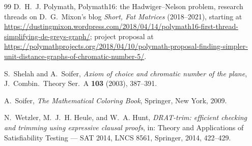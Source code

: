 \documentclass[11pt]{article}
\theoremstyle{definition}
\theoremstyle{remark}
\begin{document}
\begin{thebibliography}{99}
D.~H.~J. Polymath,
Polymath16: the Hadwiger--Nelson problem, research threads on
D.~G.~Mixon's blog \emph{Short, Fat Matrices} (2018--2021), starting at
\url{https://dustingmixon.wordpress.com/2018/04/14/polymath16-first-thread-simplifying-de-greys-graph/};
project proposal at
\url{https://polymathprojects.org/2018/04/10/polymath-proposal-finding-simpler-unit-distance-graphs-of-chromatic-number-5/}.

S.~Shelah and A.~Soifer,
\emph{Axiom of choice and chromatic number of the plane},
J.\ Combin.\ Theory Ser.\ A \textbf{103} (2003), 387--391.

A.~Soifer,
\emph{The Mathematical Coloring Book},
Springer, New York, 2009.

N.~Wetzler, M.~J.~H. Heule, and W.~A. Hunt,
\emph{DRAT-trim: efficient checking and trimming using expressive
clausal proofs}, in: Theory and Applications of Satisfiability Testing
--- SAT 2014, LNCS 8561, Springer, 2014, 422--429.

\end{thebibliography}
\end{document}
